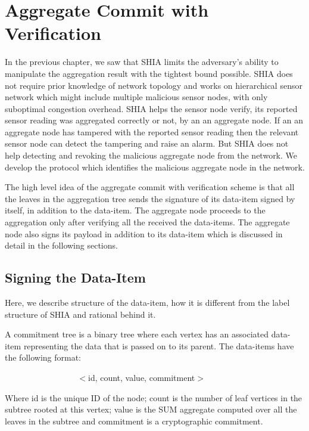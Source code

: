 \chapter{Aggregate Commit with Verification} %
\label{cha:A Protocol for Commitment Tree Generation}
	In the previous chapter, we saw that SHIA limits the adversary's ability to manipulate the aggregation result with the tightest bound possible.
	SHIA does not require prior knowledge of network topology and works on hierarchical sensor network which might include multiple malicious sensor nodes, with only suboptimal congestion overhead.
	SHIA helps the sensor node verify, its reported sensor reading was aggregated correctly or not, by an an aggregate node.
	If an an aggregate node has tampered with the reported sensor reading then the relevant sensor node can detect the tampering and raise an alarm.
	But SHIA does not help detecting and revoking the malicious aggregate node from the network.
	We develop the protocol which identifies the malicious aggregate node in the network.
	
	The high level idea of the aggregate commit with verification scheme is that all the leaves in the aggregation tree sends the signature of its data-item signed by itself, in addition to the data-item.
	The aggregate node proceeds to the aggregation only after verifying all the received the data-items.
	The aggregate node also signs its payload in addition to its data-item which is discussed in detail in the following sections.

\section{Signing the Data-Item}
	
	Here, we describe structure of the data-item, how it is different from the label structure of SHIA and rational behind it.	
	\begin{definition}
		\label{def:data-item}
		A commitment tree is a binary tree where each vertex has an associated data-item representing the data that is passed on to its parent. The data-items have the following format:

		$\hspace{100pt}$ $<$id, count, value, commitment$>$
	\end{definition}
	Where id is the unique ID of the node; count is the number of leaf vertices in the subtree rooted at this vertex; value is the SUM aggregate computed over all the leaves in the subtree and commitment is a cryptographic commitment.
	
